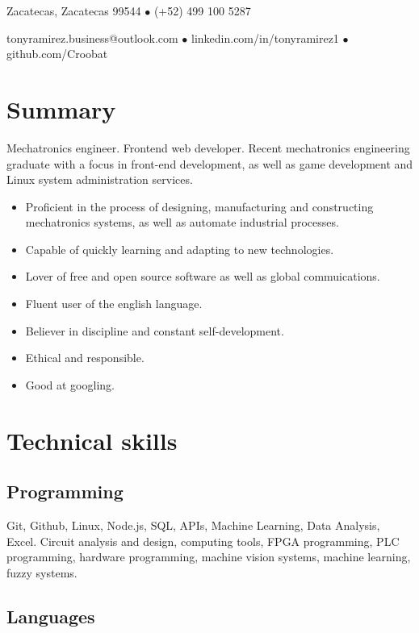 \documentclass{article}
\author{Luis A. Ramírez García}
\makeatletter
\renewcommand{\maketitle}{
  \begin{center}
    {
      \huge\bfseries
      \theauthor{}
    }

    \vspace{1em}

    Zacatecas, Zacatecas 99544 $\bullet$ (+52) 499 100 5287

    \vspace{0.5em}

    tonyramirez.business@outlook.com $\bullet$ linkedin.com/in/tonyramirez1 $\bullet$ github.com/Croobat

    \vspace{-0.5em}

  \end{center}
}
\makeatother
\begin{document}
  \maketitle

  \section{Summary}%

  Mechatronics engineer. Frontend web developer. Recent mechatronics engineering graduate with a focus in front-end development, as well as game development and Linux system administration services.

  \begin{itemize}
    \item Proficient in the process of designing, manufacturing and constructing mechatronics systems, as well as automate industrial processes.

    \item Capable of quickly learning and adapting to new technologies.

    \item Lover of free and open source software as well as global commuications.

    \item Fluent user of the english language.

    \item Believer in discipline and constant self-development.

    \item Ethical and responsible.

    \item Good at googling.
  \end{itemize}%


  \section{Technical skills}%

  \subsection{Programming}

  Git, Github, Linux, Node.js, SQL, APIs, Machine Learning, Data Analysis, Excel. Circuit analysis and design, computing tools, FPGA programming, PLC programming,  hardware programming, machine vision systems, machine learning, fuzzy systems.

    \subsection{Languages}
\end{document}
